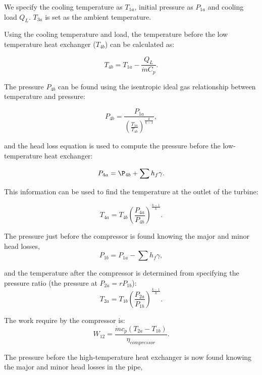 \documentclass{article}
\begin{document}
We specify the cooling temperature as $T_{1a}$, initial pressure as $P_{1a}$ and cooling load $Q_L$. $T_{3a}$  is set as the ambient temperature.

Using the cooling temperature and load, the temperature before the low temperature heat exchanger ($T_{4b}$) can be calculated as:

\begin{equation}
T_{4b} = T_{1a} - \frac{Q_L}{\dot{m} C_p}.
\end{equation}

The pressure  $P_{4b}$ can be found using the isentropic ideal gas relationship between temperature and pressure: 

\begin{equation}
    P_{4b} = \frac{P_{1a}}{(\frac{T_{1a}}{T_{4b}})^{\frac{k}{k-1}}},
\end{equation}

and the head loss equation is used to compute the pressure before the low-temperature heat exchanger:

\begin{equation}
    P_{4a} = \P_{4b} + \sum h_f  \gamma.
\end{equation}

This information can be used to find the temperature at the outlet of the turbine:

\begin{equation}
   T_{4a} = T_{4b} (\frac{P_{4a}}{P_{4b}})^{\frac{k-1}{k}}.
\end{equation}

The pressure just before the compressor is found knowing the major and minor head losses,
\begin{equation}
    P_{1b} = P_{1a} - \sum h_f  \gamma,
\end{equation}

and the temperature after the compressor is determined from specifying the pressure ratio (the pressure at $P_{2a}=rP_{1b}$):
\begin{equation}
   T_{2a} = T_{1b} (\frac{P_{2a}}{P_{1b}})^{\frac{k-1}{k}}.
\end{equation}

The work require by the compressor is:
\begin{equation}
    W_{12} = \frac{\dot{m} c_p (T_{2a} - T_{1b})}{\eta_{compressor}}.
\end{equation}

The pressure before the high-temperature heat exchanger
is now found knowing the major and minor head losses in the pipe, 
\end{document}
